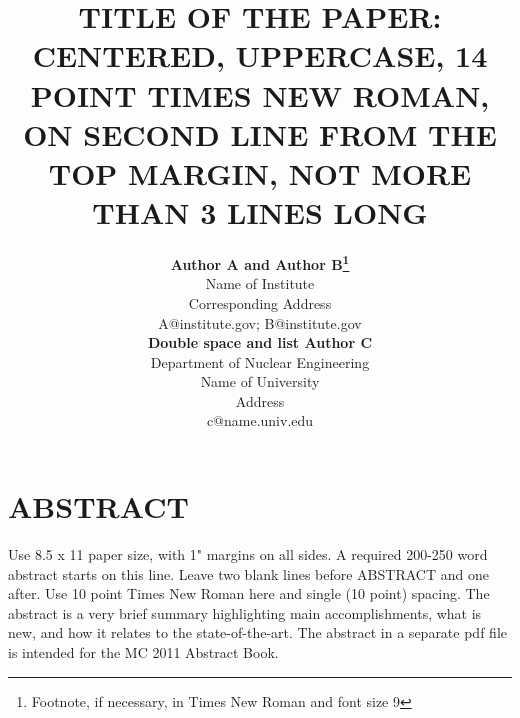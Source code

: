 \documentclass[11pt,letter,twoside]{mc2011}
\begin{document}
\title{TITLE OF THE PAPER: CENTERED, UPPERCASE, 14 POINT TIMES NEW ROMAN, 
       ON SECOND LINE FROM THE TOP MARGIN, NOT MORE THAN 3 LINES LONG}

\author{
\textbf{Author A and Author B\footnote{Footnote, if necessary, in Times New Roman and font size 9}}\\
Name of Institute\\
Corresponding Address\\
A@institute.gov; B@institute.gov \vspace{1.0em} \\ 
\textbf{Double space and list Author C}\\
Department of Nuclear Engineering\\
Name of University\\
Address\\
c@name.univ.edu
}

\maketitle

\thispagestyle{empty}

\section*{ABSTRACT}

\small

Use 8.5 x 11 paper size, with 1" margins on all sides. A required 200-250 word abstract starts on this line.  Leave two blank lines before ABSTRACT and one after.  Use 10 point Times New Roman here and single (10 point) spacing.  The abstract is a very brief summary highlighting main accomplishments, what is new, and how it relates to the state-of-the-art.  The abstract in a separate pdf file is intended for the MC 2011 Abstract Book.

\end{document}
